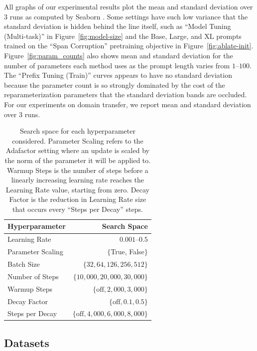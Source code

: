\documentclass[11pt]{article}
\begin{document}
All graphs of our experimental results plot the mean and standard deviation over 3 runs as computed by Seaborn \cite{Waskom2021}. Some settings have such low variance that the standard deviation is hidden behind the line itself, such as ``Model Tuning (Multi-task)'' in Figure~\ref{fig:model-size} and the Base, Large, and XL prompts trained on the ``Span Corruption'' pretraining objective in Figure~\ref{fig:ablate-init}. Figure~\ref{fig:param_counts} also shows mean and standard deviation for the number of parameters each method uses as the prompt length varies from $1$--$100$. The ``Prefix Tuning (Train)'' curves appears to have no standard deviation because the parameter count is so strongly dominated by the cost of the reparameterization parameters that the standard deviation bands are occluded. For our experiments on domain transfer, we report mean and standard deviation over 3 runs.

\begin{table}[t]
    \centering
    \footnotesize
    \begin{tabular}{l|r}
    \toprule
    Hyperparameter & Search Space \\
    \midrule
    Learning Rate  & $0.001$--$0.5$  \\
    Parameter Scaling & $\{$True, False$\}$ \\
    Batch Size & $\{32, 64, 126, 256, 512\}$ \\
    Number of Steps & $\{10{,}000, 20{,}000, 30{,}000\}$ \\
    Warmup Steps & $\{\text{off}, 2{,}000, 3{,}000 \}$ \\
    Decay Factor & $\{\text{off}, 0.1, 0.5\}$ \\
    Steps per Decay & $\{\text{off}, 4{,}000, 6{,}000, 8{,}000 \}$ \\
    \bottomrule
    \end{tabular}
    \caption{Search space for each hyperparameter considered. Parameter Scaling refers to the Adafactor setting where an update is scaled by the norm of the parameter it will be applied to. Warmup Steps is the number of steps before a linearly increasing learning rate reaches the Learning Rate value, starting from zero. Decay Factor is the reduction in Learning Rate size that occurs every ``Steps per Decay'' steps.}
    \label{tab:hyperparam-bounds}
\end{table}

\subsection{Datasets}
\end{document}
